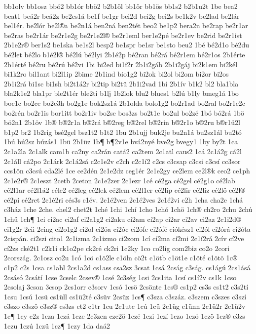 {bb1olv
bb1osz
bbó2
bb1ór
bbö2
b2b1öl
bb1ör
bb1ös
bb1s2
b2b1u2t
1be
bea2
beat1
beá2r
beá2z
be2cs1á
be1f
be1gr
bei2d
bei2g
bei2s
be1k2v
be2lad
be2lár
bel1ér.
be2lór
be2l®a
be2n1á
ben2ná
ben2tét
beo2
be1p2
bera2n
be2rap
be2r1ar
be2ras
be2r1ár
be2r1e2g
be2r1e2l®
be2r1eml
ber1e2pé
be2r1ev
be2rid
be2r1ist
2b1e2r®
ber1s2
be1ska
be1s2l
besp2
be1spr
be1sr
be1sto
beu2
1bé
bé2d1o
bé2du
bé2let
bé2lo
b1é2l®
bé2lú
bé2lyi
2b1é2p
bé2ran
bé2rá
bé2r1em
bé2r1os
2b1érte
2b1érté
bé2ru
bé2rú
bé2vi
1bi
bi2ed
bi1f2r
2b1i2gáb
2b1i2gáj
bi2k1em
bi2kél
bi1k2ro
bil1ant
bi2l1ip
2bime
2b1ind
bio1g2
bi2ok
bi2ol
bi2om
bi2or
bi2os
2b1i2rá
bi1sc
bi1sh
bi2t1á2r
bi2tip
bi2tü
2b1i2vad
1bí
2b1ív
b1k2
bl2
bla1bla
bla2k1e2
bla1pr
ble2t1ér
ble2ti
b1lj
1b2lok
blu2
blues1
b2lú
b1ly
bmeg1á
1bo
boc1c
bo2ce
bo2c3h
bo2g1e
bok2sz1á
2b1olda
bolo1g2
bo2r1ad
bo2ral
bo2r1e2c
bo2rén
bo2r1is
bor1itt
bo2r1iv
bo2se
bos3zs
bo2t1e
bo2ul
bo2zé
1bó
bó2rá
1bö
bö2n1
2b1öv
1b®
b®2r1a
b®2rá
b®2reg
b®2rel
b®2rin
b®2r1o
b®2ru
b®r1ü2l
b1p2
br2
1b2rig
bsé2gel
bsz1t2
b1t2
1bu
2b1ujj
buk2je
bu2n1á
bu2sz1ál
bu2tó
1bú
bú2sz
búzás1
1bü
2b1üz
1b¶
b¶2v1e
bvá2nyé
bve2g
bvegy1
1by
by2t
1ca
2c1a2la
2c1alk
cam1b
ca2ny
ca2rán
catá2
ca2tem
2c1atl
caus2
1cá
2c1á2g
cá2l
2c1áll
cá2po
2c1árk
2c1á2sá
c2c1e2v
c2ch
c2c1í2
c2cs
c3csap
c3csi
c3csí
cc3sor
ccs1ön
c3csú
cda2lé
1ce
ce2dén
2c1e2dz
ceg1ér
2c1e2gy
ce2lem
ce2l®k
ceo2
ce1ph
2c1e2r®
2c1eszt
2cetb
2ceton
2c1e2zer
2c1ezr
1cé
cé2ga
cé2gel
cé2g1o
cé2lab
cé2l1ar
cé2l1á2
céle2
cé2leg
cé2lek
cé2lem
cé2l1er
cé2lip
cé2lir
cé2liz
cé2lö
cé2l®
cé2pí
cé2ret
2c1é2ri
cés3s
c1év.
2c1é2ven
2c1é2ves
2c1é2vi
c2h
1cha
cha2e
1chá
c3ház
1che
2che.
chel2
chet2t
1ché
1chi
1chí
1cho
1chó
1chö
1ch®
ch2ro
2chu
2chú
1chü
1ch¶
1ci
ci2ac
ci2af
ci2a1g2
ci2aku
ci2am
ci2ap
ci2ar
ci2av
ci2az
2c1i2d®
ci1g2r
2cii
2cing
ci2o1g2
ci2ol
ci2óa
ci2óc
ci2ófe
ci2ófé
ciókész1
ci2ól
ci2órá
ci2óta
2cispán.
ci2szi
cito1
2c1izma
2c1izmo
ci2zom
1cí
cí2ma
cí2mi
2c1í2rá
2cív
cí2ve
cí2zs
cké2t1
c2k1í
ck1o2pe
ck2ré
ck2ri
1c2ky
1co
co2lig
com2biz
co2o
2cori
2cország.
2c1osz
co2u
1có
1cö
c1ö2le
c1öln
cö2t
c1ötb
c1öt1e
c1öté
c1ötö
1c®
c1p2
c2s
1csa
cs1abl
2cs1a2d
cs1ass
csa2sz
3csat
1csá
2cság
c3ság.
cs1ágú
2cs1ásá
2csásó
2csátí
1cse
2cselc
2csev®
1csé
2c3ség
1csi
2cs1ita
1csí
cs1í2v
cs1k
1cso
2csolaj
3cson
3csop
2cs1orr
c3sorv
1csó
1csö
2csönte
1cs®
cs1p2
cs3s
cs1t2
c3s2tí
1csu
1csú
1csü
cs1üll
cs1ü2té
c3süv
2csüz
1cs¶
c3sza
c3száz.
c3szem
c3szes
c3szí
c3szo
c3szö
c3sz®
cs3zs
ct2
c1tr
1cu
2c1utc
1cú
1cü
2c1üg
c1ünn
2c1ü2r
2c1ü2v
1c¶
1cy
c2z
1cza
1czá
1cze
2c3zen
cze2ö
1czé
1czi
1czí
1czo
1czó
1czö
1cz®
c3zs
1czu
1czú
1czü
1cz¶
1czy
1da
daá2
}
